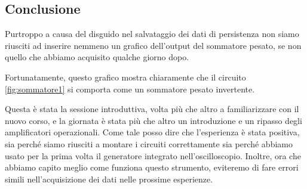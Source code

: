 \subsection{Conclusione}

Purtroppo a causa del disguido nel salvataggio dei dati di persistenza non siamo
riusciti ad inserire nemmeno un grafico dell'output del sommatore pesato,
se non quello che abbiamo acquisito qualche giorno dopo.

Fortunatamente, questo grafico mostra chiaramente che il circuito \ref{fig:sommatore1}
si comporta come un sommatore pesato invertente.

Questa è stata la sessione introduttiva, volta più che altro a familiarizzare
con il nuovo corso, e la giornata è stata più che altro un introduzione e
un ripasso degli amplificatori operazionali. Come tale posso dire che l'esperienza
è stata positiva, sia perché siamo riusciti a montare i circuiti correttamente
sia perché abbiamo usato per la prima volta il generatore integrato nell'oscilloscopio.
Inoltre, ora che abbiamo capito meglio come funziona questo strumento,
eviteremo di fare errori simili nell'acquisizione dei dati nelle prossime esperienze.